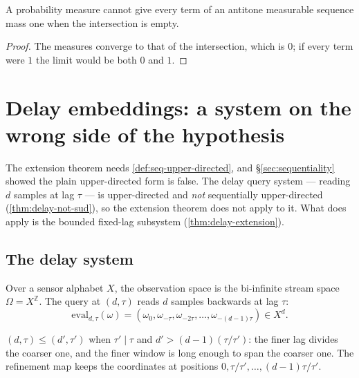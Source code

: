 \begin{lemma}
\label{lem:cont-above}
\leanok
A probability measure cannot give every term of an antitone measurable sequence
mass one when the intersection is empty.
\end{lemma}

\begin{proof}
\leanok
The measures converge to that of the intersection, which is $0$; if every term
were $1$ the limit would be both $0$ and $1$.
\end{proof}
\chapter{Delay embeddings: a system on the wrong side of the hypothesis}

The extension theorem needs \ref{def:seq-upper-directed}, and
\S\ref{sec:sequentiality} showed the plain upper-directed form is false. The
delay query system --- reading $d$ samples at lag $\tau$ --- is upper-directed
and \emph{not} sequentially upper-directed (\ref{thm:delay-not-sud}), so the
extension theorem does not apply to it. What does apply is the bounded
fixed-lag subsystem (\ref{thm:delay-extension}).

\section{The delay system}

\begin{definition}
\label{def:delay-query}
\leanok
Over a sensor alphabet $X$, the observation space is the bi-infinite stream
space $\Omega = X^{\mathbb{Z}}$. The query at $(d,\tau)$ reads $d$ samples
backwards at lag $\tau$:
\[
  \mathrm{eval}_{d,\tau}(\omega)
    = (\omega_0, \omega_{-\tau}, \omega_{-2\tau}, \dots, \omega_{-(d-1)\tau})
    \in X^d .
\]
\end{definition}

\begin{definition}
\label{def:delay-refine}
\leanok
$(d,\tau) \leq (d',\tau')$ when $\tau' \mid \tau$ and $d' > (d-1)(\tau/\tau')$:
the finer lag divides the coarser one, and the finer window is long enough to
span the coarser one. The refinement map keeps the coordinates at positions
$0, \tau/\tau', \dots, (d-1)\tau/\tau'$.
\end{definition}

